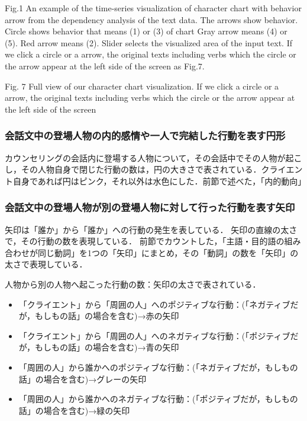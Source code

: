 \documentclass[shuuron]{kuee}
\begin{document}
Fig.1 An example of the time-series visualization of character chart with behavior arrow from the dependency analysis of the text data. The arrows show behavior. Circle shows behavior that means (1) or (3) of chart Gray arrow means (4) or (5). Red arrow means (2). Slider selects the visualized area of the input text. If we click a circle or a arrow, the original texts including verbs which the circle or the arrow appear at the left side of the screen as Fig.7.

Fig. 7 Full view of our character chart visualization. If we click a circle or a arrow, the original texts including verbs which the circle or the arrow appear at the left side of the screen

\subsubsection{会話文中の登場人物の内的感情や一人で完結した行動を表す円形}

カウンセリングの会話内に登場する人物について，その会話中でその人物が起こし，その人物自身で閉じた行動の数は，円の大きさで表されている．クライエント自身であれば円はピンク，それ以外は水色にした．前節で述べた，「内的動向」


\subsubsection{会話文中の登場人物が別の登場人物に対して行った行動を表す矢印}

矢印は「誰か」から「誰か」への行動の発生を表している．
矢印の直線の太さで，その行動の数を表現している．
前節でカウントした，「主語・目的語の組み合わせが同じ動詞」を1つの「矢印」にまとめ，その「動詞」の数を「矢印」の太さで表現している．

人物から別の人物へ起こった行動の数：矢印の太さで表されている．


\begin{itemize}
\item 「クライエント」から「周囲の人」へのポジティブな行動：(「ネガティブだが，もしもの話」の場合を含む)→赤の矢印
\item 「クライエント」から「周囲の人」へのネガティブな行動：(「ポジティブだが，もしもの話」の場合を含む)→青の矢印
\item 「周囲の人」から誰かへのポジティブな行動：(「ネガティブだが，もしもの話」の場合を含む)→グレーの矢印
\item 「周囲の人」から誰かへのネガティブな行動：(「ポジティブだが，もしもの話」の場合を含む)→緑の矢印
\end{itemize}
\end{document}
